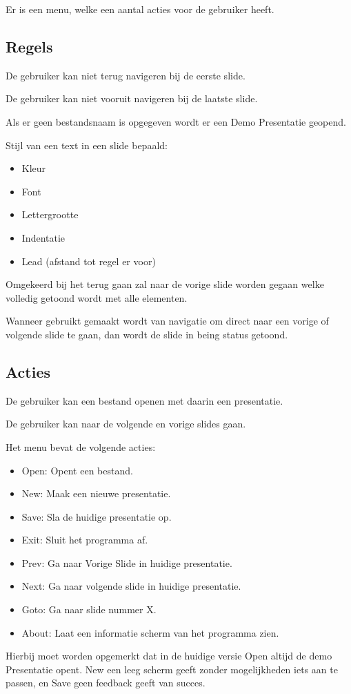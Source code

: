 \documentclass[a4paper]{article}
\begin{document}
Er is een menu, welke een aantal acties voor de gebruiker heeft.

\subsection{Regels}
De gebruiker kan niet terug navigeren bij de eerste slide.

De gebruiker kan niet vooruit navigeren bij de laatste slide.

Als er geen bestandsnaam is opgegeven wordt er een Demo Presentatie geopend.

Stijl van een text in een slide bepaald:
\begin{itemize}
    \item Kleur
    \item Font
    \item Lettergrootte
    \item Indentatie
    \item Lead (afstand tot regel er voor)
\end{itemize}

Omgekeerd bij het terug gaan zal naar de vorige slide worden gegaan welke
volledig getoond wordt met alle elementen.

Wanneer gebruikt gemaakt wordt van navigatie om direct naar een vorige of
volgende slide te gaan, dan wordt de slide in being status getoond.

\subsection{Acties}
De gebruiker kan een bestand openen met daarin een presentatie.

De gebruiker kan naar de volgende en vorige slides gaan.

Het menu bevat de volgende acties:
\begin{itemize}
    \item Open: Opent een bestand.
    \item New: Maak een nieuwe presentatie.
    \item Save: Sla de huidige presentatie op.
    \item Exit: Sluit het programma af.
    \item Prev: Ga naar Vorige Slide in huidige presentatie.
    \item Next: Ga naar volgende slide in huidige presentatie.
    \item Goto: Ga naar slide nummer X.
    \item About: Laat een informatie scherm van het programma zien.
\end{itemize}
Hierbij moet worden opgemerkt dat in de huidige versie Open altijd de demo
Presentatie opent. New een leeg scherm geeft zonder mogelijkheden iets aan te
passen, en Save geen feedback geeft van succes.
\end{document}
